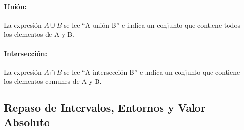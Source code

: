 \paragraph{Unión:}La expresión $A\cup B$ se lee “A unión B” e indica un conjunto que contiene todos los elementos de A y B.
\paragraph{Intersección:}La expresión $A\cap B$ se lee “A intersección B” e indica un conjunto que contiene los elementos comunes de A y B.

\subsection{Repaso de Intervalos, Entornos y Valor Absoluto}


